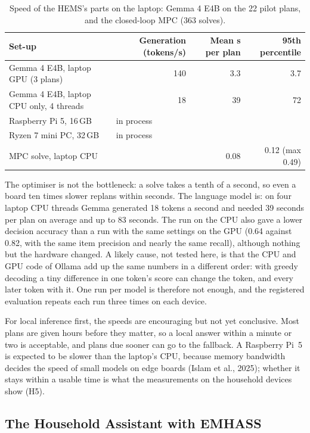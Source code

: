\documentclass[12pt,a4paper]{report}
\begin{document}
\begin{table}[htbp]
\caption{Speed of the HEMS's parts on the laptop: Gemma 4 E4B on the
22 pilot plans, and the closed-loop MPC (363 solves).}
\label{tab:edgebench}
\small
\begin{tabularx}{\textwidth}{@{}Xrrr@{}}
\toprule
Set-up & Generation (tokens/s) & Mean s per plan & 95th percentile \\
\midrule
Gemma 4 E4B, laptop GPU (3 plans) & 140 & 3.3 & 3.7 \\
Gemma 4 E4B, laptop CPU only, 4 threads & 18 & 39 & 72 \\
Raspberry Pi 5, 16\,GB & \multicolumn{3}{l}{in process} \\
Ryzen 7 mini PC, 32\,GB & \multicolumn{3}{l}{in process} \\
\midrule
MPC solve, laptop CPU & & 0.08 & 0.12 (max 0.49) \\
\bottomrule
\end{tabularx}
\end{table}

The optimiser is not the bottleneck: a solve takes a tenth of a second,
so even a board ten times slower replans within seconds. The language
model is: on four laptop CPU threads Gemma generated 18 tokens a second
and needed 39 seconds per plan on average and up to 83 seconds. The run
on the CPU also gave a lower decision accuracy than a run with the same
settings on the GPU (0.64 against 0.82, with the same item precision and
nearly the same recall), although nothing but the hardware changed. A
likely cause, not tested here, is that the CPU and GPU code of Ollama
add up the same numbers in a different order: with greedy decoding a
tiny difference in one token's score can change the token, and every
later token with it. One run per model is therefore not enough, and the
registered evaluation repeats each run three times on each device.

For local inference first, the speeds are encouraging but not yet
conclusive. Most plans are given hours before they matter, so a local
answer within a minute or two is acceptable, and plans due sooner can
go to the fallback. A Raspberry Pi~5 is expected to be slower than the
laptop's CPU, because memory bandwidth decides the speed of small
models on edge boards (Islam et al., 2025); whether it stays within a
usable time is what the measurements on the household devices show
(H5).

\subsection{The Household Assistant with EMHASS}
\label{sec:emhassdemo}
\end{document}
